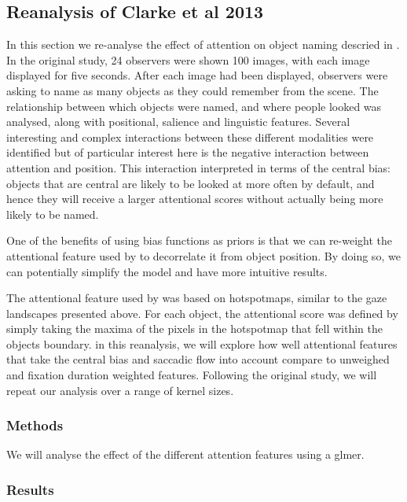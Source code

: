 \documentclass[a4paper, twocolumn, oneside, 10pt]{article}
\begin{document}
\subsection{Reanalysis of Clarke et al 2013}
\label{sec:reanalysisClarke2013}

In this section we re-analyse the effect of attention on object naming descried in \cite{clarke2013}. In the original study, 24 observers were shown 100 images, with each image displayed for five seconds. After each image had been displayed, observers were asking to name as many objects as they could remember from the scene. The relationship between which objects were named, and where people looked was analysed, along with positional, salience and linguistic features. Several interesting and complex interactions between these different modalities were identified but of particular interest here is the negative interaction between attention and position. This interaction interpreted in terms of the central bias: objects that are central are likely to be looked at more often by default, and hence they will receive a larger attentional scores without actually being more likely to be named.

One of the benefits of using bias functions as priors is that we can re-weight the attentional feature used by \cite{clarke2013} to decorrelate it from object position. By doing so, we can potentially simplify the model and have more intuitive results. 

The attentional feature used by \cite{clarke2013} was based on hotspotmaps, similar to the gaze landscapes presented above. For each object, the attentional score was defined by simply taking the maxima of the pixels in the hotspotmap that fell within the objects boundary. in this reanalysis, we will explore how well attentional features that take the central bias and saccadic flow into account compare to unweighed and fixation duration weighted features. Following the original study, we will repeat our analysis over a range of kernel sizes. 

\subsubsection{Methods}
We will analyse the effect of the different attention features using a glmer.

\subsubsection{Results}
\end{document}
